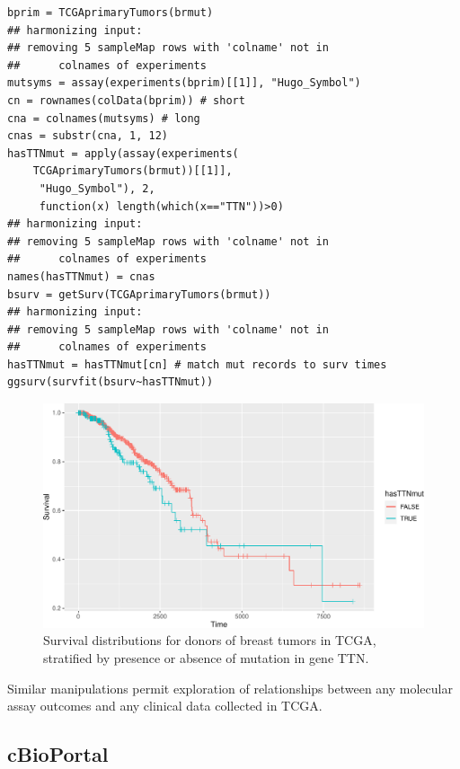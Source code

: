 \documentclass[graybox]{svmult}
\begin{document}
\begin{shaded}
\begin{verbatim}
bprim = TCGAprimaryTumors(brmut)
## harmonizing input:
## removing 5 sampleMap rows with 'colname' not in 
##      colnames of experiments
mutsyms = assay(experiments(bprim)[[1]], "Hugo_Symbol")
cn = rownames(colData(bprim)) # short
cna = colnames(mutsyms) # long
cnas = substr(cna, 1, 12)
hasTTNmut = apply(assay(experiments(
    TCGAprimaryTumors(brmut))[[1]], 
     "Hugo_Symbol"), 2, 
     function(x) length(which(x=="TTN"))>0)
## harmonizing input:
## removing 5 sampleMap rows with 'colname' not in
##      colnames of experiments
names(hasTTNmut) = cnas
bsurv = getSurv(TCGAprimaryTumors(brmut))
## harmonizing input:
## removing 5 sampleMap rows with 'colname' not in 
##      colnames of experiments
hasTTNmut = hasTTNmut[cn] # match mut records to surv times
ggsurv(survfit(bsurv~hasTTNmut))
\end{verbatim}
\end{shaded}


\begin{figure}
\includegraphics[width=1\linewidth,]{bioccb_files/figure-latex/strat-1} \caption{Survival distributions for donors of breast tumors in TCGA, stratified by presence or absence of mutation in gene TTN.}\label{fig:strat}
\end{figure}

Similar manipulations permit exploration of relationships between
any molecular assay outcomes and any clinical data collected in TCGA.


\subsection{cBioPortal}\label{cbioportal}
\end{document}
